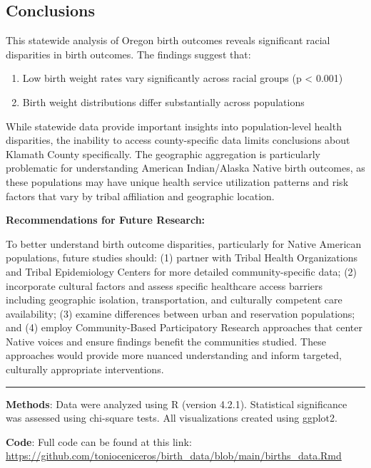 \documentclass[
]{article}
\providecommand{\tightlist}{%
  \setlength{\itemsep}{0pt}\setlength{\parskip}{0pt}}
\begin{document}
\hypertarget{conclusions}{%
\subsection{Conclusions}\label{conclusions}}

This statewide analysis of Oregon birth outcomes reveals significant
racial disparities in birth outcomes. The findings suggest that:

\begin{enumerate}
\def\labelenumi{\arabic{enumi}.}
\tightlist
\item
  Low birth weight rates vary significantly across racial groups (p
  \textless{} 0.001)
\item
  Birth weight distributions differ substantially across populations
\end{enumerate}

While statewide data provide important insights into population-level
health disparities, the inability to access county-specific data limits
conclusions about Klamath County specifically. The geographic
aggregation is particularly problematic for understanding American
Indian/Alaska Native birth outcomes, as these populations may have
unique health service utilization patterns and risk factors that vary by
tribal affiliation and geographic location.

\textbf{Recommendations for Future Research:}

To better understand birth outcome disparities, particularly for Native
American populations, future studies should: (1) partner with Tribal
Health Organizations and Tribal Epidemiology Centers for more detailed
community-specific data; (2) incorporate cultural factors and assess
specific healthcare access barriers including geographic isolation,
transportation, and culturally competent care availability; (3) examine
differences between urban and reservation populations; and (4) employ
Community-Based Participatory Research approaches that center Native
voices and ensure findings benefit the communities studied. These
approaches would provide more nuanced understanding and inform targeted,
culturally appropriate interventions.

\begin{center}\rule{0.5\linewidth}{0.5pt}\end{center}

\textbf{Methods}: Data were analyzed using R (version 4.2.1).
Statistical significance was assessed using chi-square tests. All
visualizations created using ggplot2.

\textbf{Code}: Full code can be found at this link:
\url{https://github.com/tonioceniceros/birth_data/blob/main/births_data.Rmd}
\end{document}
